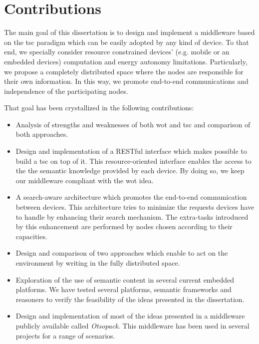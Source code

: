 \section{Contributions}
\label{sec:Contributions}

The main goal of this dissertation is to design and implement a middleware based on the \ac{tsc} paradigm which can be easily adopted by any kind of device.
To that end, we specially consider resource constrained devices' (e.g. mobile or an embedded devices) computation and energy autonomy limitations.
Particularly, we propose a completely distributed space where the nodes are responsible for their own information.
In this way, we promote end-to-end communications and independence of the participating nodes.


That goal has been crystallized in the following contributions:

\begin{itemize} %
  \item Analysis of strengths and weaknesses of both \ac{wot} and \ac{tsc} and comparison of both approaches.
  \item Design and implementation of a RESTful interface which makes possible to build a \ac{tsc} on top of it. %
	This resource-oriented interface enables the access to the the semantic knowledge provided by each device.
	By doing so, we keep our middleware compliant with the \ac{wot} idea. %
  \item A search-aware architecture which promotes the end-to-end communication between devices. %
	This architecture tries to minimize the requests devices have to handle by enhancing their search mechanism.
	The extra-tasks introduced by this enhancement are performed by nodes chosen according to their capacities.
  \item Design and comparison of two approaches which enable to act on the environment by writing in the fully distributed space.
  \item Exploration of the use of semantic content in several current embedded platforms.
	We have tested several platforms, semantic frameworks and reasoners to verify the feasibility of the ideas presented in the dissertation.
  \item Design and implementation of most of the ideas presented in a middleware publicly available called \emph{Otsopack}. %
	This middleware has been used in several projects for a range of scenarios.
\end{itemize}